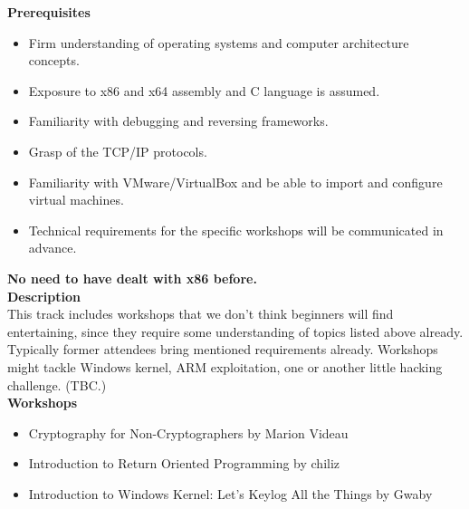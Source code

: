 \def\abstracttitle{Reversing All the Things}
\def\abstractcomment{Track 3 [Intermediate / Advanced]}
\def\abstractowner{Various}

\thispagestyle{abstract}

  \textbf{Prerequisites}
  \begin{itemize}
  	\item Firm understanding of operating systems and computer architecture concepts.
    \item Exposure to x86 and x64 assembly and C language is assumed.
    \item Familiarity with debugging and reversing frameworks.
    \item Grasp of the TCP/IP protocols.
    \item Familiarity with VMware/VirtualBox and be able to import and configure virtual machines.
    \item Technical requirements for the specific workshops will be communicated in advance.
  \end{itemize}

  \textbf{No need to have dealt with x86 before.}\\

  \textbf{Description}\\

  This track includes workshops that we don't think beginners will find entertaining, since they require some understanding of topics listed above already. Typically former attendees bring mentioned requirements already. Workshops might tackle Windows kernel, ARM exploitation, one or another little hacking challenge. (TBC.)\\

  \textbf{Workshops}
  \begin{itemize}
    \item Cryptography for Non-Cryptographers by Marion Videau
    \item Introduction to Return Oriented Programming by chiliz
    \item Introduction to Windows Kernel: Let's Keylog All the Things by Gwaby
  \end{itemize}
